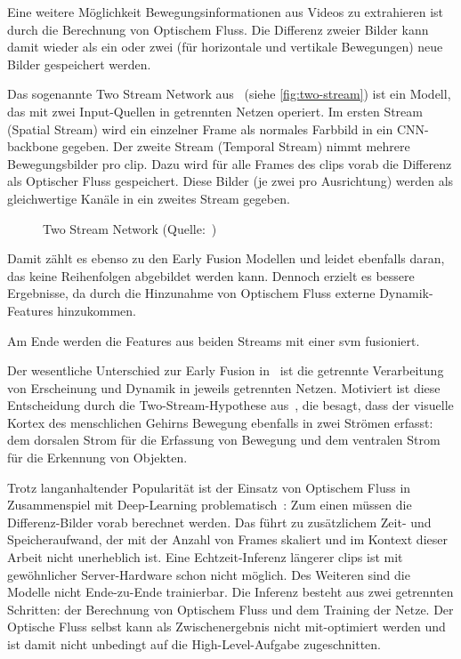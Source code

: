 Eine weitere Möglichkeit Bewegungsinformationen aus Videos zu extrahieren ist durch die Berechnung von Optischem Fluss.
Die Differenz zweier Bilder kann damit wieder als ein oder zwei (für horizontale und vertikale Bewegungen) neue Bilder gespeichert werden.

Das sogenannte Two Stream Network aus~\cite{Simonyan14} (siehe \autoref{fig:two-stream}) ist ein Modell, das mit zwei Input-Quellen in getrennten Netzen operiert.
Im ersten Stream (Spatial Stream) wird ein einzelner Frame als normales Farbbild in ein CNN-backbone gegeben.
Der zweite Stream (Temporal Stream) nimmt mehrere Bewegungsbilder pro \gls{clip}.
Dazu wird für alle Frames des \glspl{clip} vorab die Differenz als Optischer Fluss gespeichert.
Diese Bilder (je zwei pro Ausrichtung) werden als gleichwertige Kanäle in ein zweites Stream gegeben.

\begin{figure}[h!]
    \centering
    \caption{Two Stream Network (Quelle:~\cite{Simonyan14})}
    \label{fig:two-stream}
\end{figure}

Damit zählt es ebenso zu den Early Fusion Modellen und leidet ebenfalls daran, das keine Reihenfolgen abgebildet werden kann.
Dennoch erzielt es bessere Ergebnisse, da durch die Hinzunahme von Optischem Fluss externe Dynamik-Features hinzukommen.

Am Ende werden die Features aus beiden Streams mit einer \gls{svm} fusioniert.

Der wesentliche Unterschied zur Early Fusion in~\cite{Karpathy14} ist die getrennte Verarbeitung von Erscheinung und Dynamik in jeweils getrennten Netzen.
Motiviert ist diese Entscheidung durch die Two-Stream-Hypothese aus~\cite{Goodale92}, die besagt, dass der visuelle Kortex des menschlichen Gehirns Bewegung ebenfalls in zwei Strömen erfasst:
dem dorsalen Strom für die Erfassung von Bewegung und dem ventralen Strom für die Erkennung von Objekten.

Trotz langanhaltender Popularität ist der Einsatz von Optischem Fluss in Zusammenspiel mit Deep-Learning problematisch~\cite{Zhu17}:
Zum einen müssen die Differenz-Bilder vorab berechnet werden.
Das führt zu zusätzlichem Zeit- und Speicheraufwand, der mit der Anzahl von Frames skaliert und im Kontext dieser Arbeit nicht unerheblich ist.
Eine Echtzeit-Inferenz längerer \glspl{clip} ist mit gewöhnlicher Server-Hardware schon nicht möglich.
Des Weiteren sind die Modelle nicht Ende-zu-Ende trainierbar.
Die Inferenz besteht aus zwei getrennten Schritten: der Berechnung von Optischem Fluss und dem Training der Netze.
Der Optische Fluss selbst kann als Zwischenergebnis nicht mit-optimiert werden und ist damit nicht unbedingt auf die High-Level-Aufgabe zugeschnitten.

